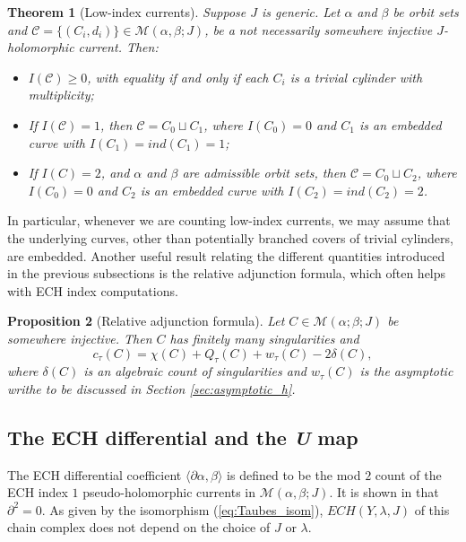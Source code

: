 \documentclass{article}
\numberwithin{equation}{section}
\newtheorem{theorem}{Theorem}[section]
\newtheorem{proposition}[theorem]{Proposition}
\theoremstyle{definition}
\begin{document}
\begin{theorem}[Low-index currents]\cite[Proposition 3.7]{Hutchings}
\label{thm:low_index}
Suppose $J$ is generic. Let $\alpha$ and $\beta$ be orbit sets and $\mathcal{C} = \{(C_i, d_i)\}\in \mathcal{M}(\alpha, \beta;J)$, be a not necessarily somewhere injective $J$-holomorphic current. Then:
\begin{itemize}
    \item $I(\mathcal{C}) \geq 0$, with equality if and only if each $C_i$ is a trivial cylinder with multiplicity;
    \item If $I(\mathcal{C})=1$, then $\mathcal{C} = C_0 \sqcup C_1$, where $I(C_0) = 0$ and $C_1$ is an embedded curve with $I(C_1) = ind(C_1) = 1$;
    \item If $I(C)=2$, and $\alpha$ and  $\beta$ are admissible orbit sets, then $\mathcal{C} = C_0 \sqcup C_2$, where $I(C_0) = 0$ and $C_2$ is an embedded curve with $I(C_2) = ind(C_2) = 2$.
\end{itemize}
\end{theorem}

In particular, whenever we are counting low-index currents, we may assume that the underlying curves, other than potentially branched covers of trivial cylinders, are embedded. Another useful result relating the different quantities introduced in the previous subsections is the relative adjunction formula, which often helps with ECH index computations.

\begin{proposition}[Relative adjunction formula]\cite[Proposition 4.9]{Hutchings_index_revisited}
\label{prop:adjunction}
    Let $C\in \mathcal{M}(\alpha;\beta;J)$ be somewhere injective. Then $C$ has finitely many singularities and
    \begin{equation}
        c_\tau (C) = \chi(C) + Q_\tau(C) + w_\tau(C) - 2\delta(C),
    \end{equation}
    where $\delta(C)$ is an algebraic count of singularities and $w_\tau(C)$ is the asymptotic writhe to be discussed in Section \ref{sec:asymptotic_h}.
\end{proposition}

\subsection{The ECH differential and the \emph{U} map}

The ECH differential coefficient $\langle \partial \alpha, \beta\rangle$ is defined to be the mod $2$ count of the ECH index $1$ pseudo-holomorphic currents in $\mathcal{M}(\alpha,\beta;J)$. It is shown in \cite{HT_gluing1,HT_gluing2} that $\partial^2 = 0$. As given by the isomorphism (\ref{eq:Taubes_isom}), $ECH(Y, \lambda, J)$ of this chain complex does not depend on the choice of $J$ or $\lambda$. 
\end{document}
